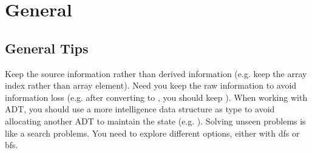 \chapter{General}
\section{General Tips}
 Keep the source information rather than derived information (e.g. keep the array index rather than array element).
 Need you keep the raw information to avoid information loss (e.g. after converting  to , you should keep ).
 When working with ADT, you should use a more intelligence data structure as type to avoid allocating another ADT to maintain the state (e.g. ). 
 Solving unseen problems is like a search problems. You need to explore different options, either with dfs or bfs. 
